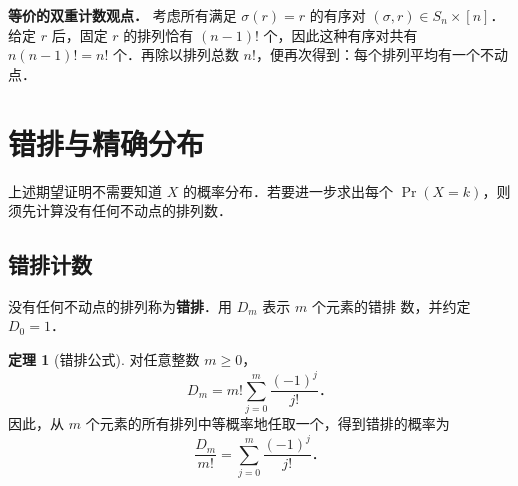 \documentclass[UTF8,11pt,a4paper,fontset=none]{ctexart}
\theoremstyle{definition}
\newtheorem{theorem}{定理}
\begin{document}
\textbf{等价的双重计数观点．}
考虑所有满足 \(\sigma(r)=r\) 的有序对
\((\sigma,r)\in S_n\times[n]\)．给定 \(r\) 后，固定 \(r\) 的排列恰有
\((n-1)!\) 个，因此这种有序对共有 \(n(n-1)!=n!\) 个．再除以排列总数
\(n!\)，便再次得到：每个排列平均有一个不动点．

\section{错排与精确分布}

上述期望证明不需要知道 \(X\) 的概率分布．若要进一步求出每个
\(\Pr(X=k)\)，则须先计算没有任何不动点的排列数．

\subsection{错排计数}

没有任何不动点的排列称为\textbf{错排}．用 \(D_m\) 表示 \(m\) 个元素的错排
数，并约定 \(D_0=1\)．

\begin{theorem}[错排公式]
对任意整数 \(m\geq 0\)，
\[
  D_m=m!\sum_{j=0}^{m}\frac{(-1)^j}{j!}\text{．}
\]
因此，从 \(m\) 个元素的所有排列中等概率地任取一个，得到错排的概率为
\[
  \frac{D_m}{m!}=\sum_{j=0}^{m}\frac{(-1)^j}{j!}\text{．}
\]
\end{theorem}
\end{document}
